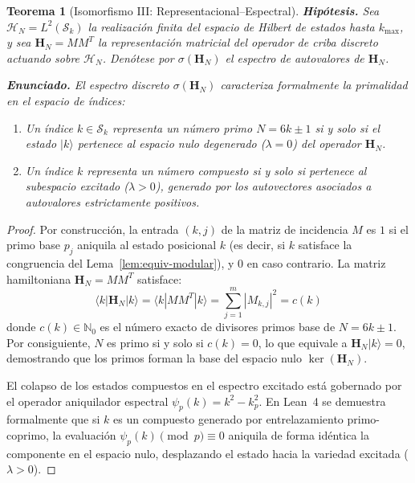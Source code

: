 \documentclass{article}
\numberwithin{equation}{section}
\theoremstyle{plain}
\newtheorem{theorem}{Teorema}[section]
\theoremstyle{definition}
\begin{document}
\begin{theorem}[Isomorfismo III: Representacional--Espectral]
\label{thm:iso-III}
\textbf{Hipótesis.} Sea $\mathcal{H}_N = L^2(\mathcal{S}_k)$ la realización finita del espacio de Hilbert de estados hasta $k_{\max}$, y sea $\mathbf{H}_N = M M^T$ la representación matricial del operador de criba discreto actuando sobre $\mathcal{H}_N$. Denótese por $\sigma(\mathbf{H}_N)$ el espectro de autovalores de $\mathbf{H}_N$.

\textbf{Enunciado.} El espectro discreto $\sigma(\mathbf{H}_N)$ caracteriza formalmente la primalidad en el espacio de índices:
\begin{enumerate}
    \item Un índice $k \in \mathcal{S}_k$ representa un número primo $N = 6k \pm 1$ si y solo si el estado $|k\rangle$ pertenece al espacio nulo degenerado ($\lambda = 0$) del operador $\mathbf{H}_N$.
    \item Un índice $k$ representa un número compuesto si y solo si pertenece al subespacio excitado ($\lambda > 0$), generado por los autovectores asociados a autovalores estrictamente positivos.
\end{enumerate}
\end{theorem}

\begin{proof}
Por construcción, la entrada $(k, j)$ de la matriz de incidencia $M$ es $1$ si el primo base $p_j$ aniquila al estado posicional $k$ (es decir, si $k$ satisface la congruencia del Lema~\ref{lem:equiv-modular}), y $0$ en caso contrario. La matriz hamiltoniana $\mathbf{H}_N = M M^T$ satisface:
\begin{equation}
\langle k | \mathbf{H}_N | k \rangle = \langle k | M M^T | k \rangle = \sum_{j=1}^{m} |M_{k, j}|^2 = c(k)
\end{equation}
donde $c(k) \in \mathbb{N}_0$ es el número exacto de divisores primos base de $N = 6k \pm 1$. Por consiguiente, $N$ es primo si y solo si $c(k) = 0$, lo que equivale a $\mathbf{H}_N |k\rangle = 0$, demostrando que los primos forman la base del espacio nulo $\ker(\mathbf{H}_N)$.

El colapso de los estados compuestos en el espectro excitado está gobernado por el operador aniquilador espectral $\psi_p(k) = k^2 - k_p^2$. En Lean~4 se demuestra formalmente que si $k$ es un compuesto generado por entrelazamiento primo-coprimo, la evaluación $\psi_p(k) \pmod p \equiv 0$ aniquila de forma idéntica la componente en el espacio nulo, desplazando el estado hacia la variedad excitada ($\lambda > 0$).
\end{proof}
\end{document}
